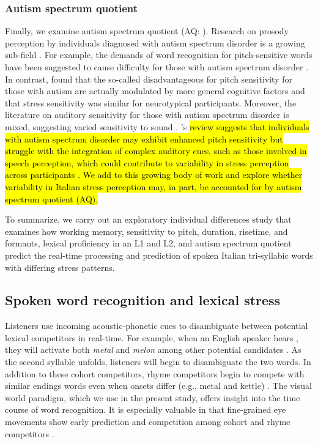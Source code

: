 \subsubsection{Autism spectrum quotient}
Finally, we examine autism spectrum quotient (AQ: \cite{Baron-Cohen2001}). Research on prosody perception by individuals diagnosed with autism spectrum disorder is a growing sub-field \citep[see ][]{Grice2023, Paul2005, McCann2003}. For example, the demands of word recognition for pitch-sensitive words have been suggested to cause difficulty for those with autism spectrum disorder \citep{schelinski2020speech}. In contrast, \cite{grossman2023relationship} found that the so-called disadvantageous for pitch sensitivity for those with autism are actually modulated by more general cognitive factors and that stress sensitivity was similar for neurotypical participants. Moreover, the literature on auditory sensitivity for those with autism spectrum disorder is mixed, suggesting varied sensitivity to sound \citep{Kuiper2019, Stiegler2010}. \cite{haesen2011review}'s \hl{review suggests that individuals with autism spectrum disorder may exhibit enhanced pitch sensitivity but struggle with the integration of complex auditory cues, such as those involved in speech perception, which could contribute to variability in stress perception across participants . We add to this growing body of work and explore whether variability in Italian stress perception may, in part, be accounted for by autism spectrum quotient (AQ). }

To summarize, we carry out an exploratory individual differences study that examines how working memory, sensitivity to pitch, duration, risetime, and formants, lexical proficiency in an L1 and L2, and autism spectrum quotient predict the real-time processing and prediction of spoken Italian tri-syllabic words with differing stress patterns.

\subsection{Spoken word recognition and lexical stress}

Listeners use incoming acoustic-phonetic cues to disambiguate between potential lexical competitors in real-time. For example, when an English speaker hears , they will activate both \textit{metal} and \textit{melon} among other potential candidates \citep{Marslen1980}. As the second syllable unfolds, listeners will begin to disambiguate the two words. In addition to these cohort competitors, rhyme competitors begin to compete with similar endings words even when onsets differ (e.g., metal and kettle) \citep{Allopenna_1998}. The visual world paradigm, which we use in the present study, offers insight into the time course of word recognition. It is especially valuable in that fine-grained eye movements show early prediction and competition among cohort and rhyme competitors \citep{Allopenna_1998}.


